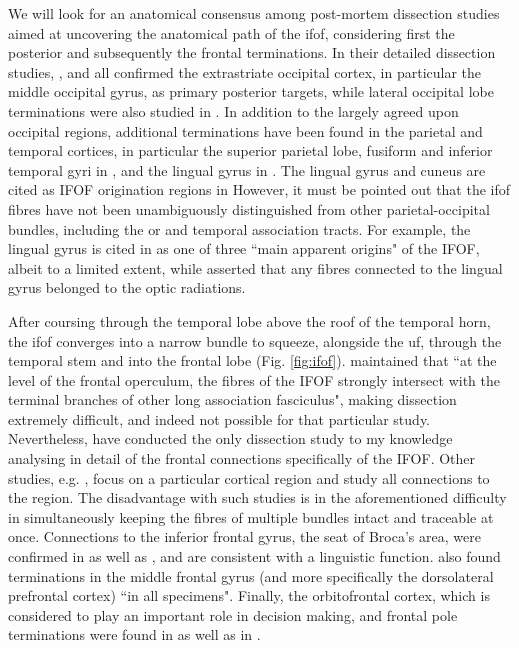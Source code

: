 We will look for an anatomical consensus among post-mortem dissection studies aimed at uncovering the anatomical path of the \gls{ifof}, considering first the posterior and subsequently the frontal terminations.
In their detailed dissection studies, \textcite{Martino2010}, and \textcite{Sarubbo2013} all confirmed the extrastriate occipital cortex, in particular the middle occipital gyrus, as primary posterior targets, while lateral occipital lobe terminations were also studied in \textcite{Palejwala2020}.
In addition to the largely agreed upon occipital regions, additional terminations have been found in the parietal and temporal cortices, in particular the superior parietal lobe, fusiform and inferior temporal gyri in \textcite{Martino2010}, and the lingual gyrus in \textcite{Sarubbo2013}.
The lingual gyrus and cuneus are cited as IFOF origination regions in \textcite{Palejwala2021}
However, it must be pointed out that the \gls{ifof} fibres have not been unambiguously distinguished from other parietal-occipital bundles, including the \gls{or} and temporal association tracts.
For example, the lingual gyrus is cited in \textcite{Sarubbo2013} as one of three ``main apparent origins" of the IFOF, albeit to a limited extent, while \textcite{Martino2010} asserted that any fibres connected to the lingual gyrus belonged to the optic radiations.

After coursing through the temporal lobe above the roof of the temporal horn,\autocite{Martino2010,Kljajevic2014a} the \gls{ifof} converges into a narrow bundle to squeeze, alongside the \gls{uf}, through the temporal stem and into the frontal lobe (Fig. \ref{fig:ifof}).\autocite{Martino2010,Sarubbo2013}
\textcite{Martino2010} maintained that ``at the level of the frontal operculum, the fibres of the IFOF strongly intersect with the terminal branches of other long association fasciculus", making dissection extremely difficult, and indeed not possible for that particular study.
Nevertheless, \textcite{Sarubbo2013} have conducted the only dissection study to my knowledge analysing in detail of the frontal connections specifically of the IFOF.
Other studies, e.g. \textcite{Burks2017}, focus on a particular cortical region and study all connections to the region.
The disadvantage with such studies is in the aforementioned difficulty in simultaneously keeping the fibres of multiple bundles intact and traceable at once.
Connections to the inferior frontal gyrus, the seat of Broca's area, were confirmed in \textcite{Sarubbo2013} as well as \textcite{Hau2016}, and are consistent with a linguistic function.
\textcite{Sarubbo2013} also found terminations in the middle frontal gyrus (and more specifically the dorsolateral prefrontal cortex) ``in all specimens".
Finally, the orbitofrontal cortex, which is considered to play an important role in decision making, and frontal pole terminations were found in \textcite{Sarubbo2013} as well as in \textcite{Burks2017}.

